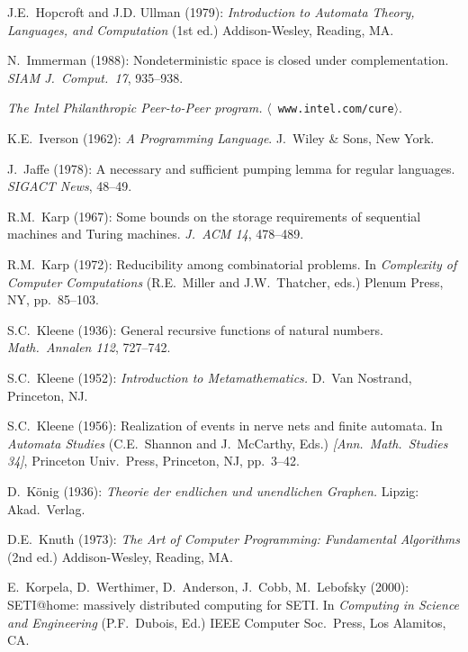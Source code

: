 \begin{thebibliography}{999}
J.E.~Hopcroft and J.D. Ullman (1979):
{\it Introduction to Automata Theory, Languages, and Computation} (1st
ed.)
Addison-Wesley, Reading, MA.


N.~Immerman (1988): Nondeterministic space is closed under
complementation.  {\it SIAM J.~Comput.~17}, 935--938.

{\it The Intel Philanthropic Peer-to-Peer program.}  $\langle${\tt
www.intel.com/cure}$\rangle$.

K.E.~Iverson (1962):
{\it A Programming Language}.
J.~Wiley \& Sons, New York.


J.~Jaffe (1978): A necessary and sufficient pumping lemma for regular
languages.  {\it SIGACT News}, 48--49.


R.M.~Karp (1967): Some bounds on the storage requirements of
sequential machines and Turing machines.  {\it J.~ACM 14}, 478--489.

R.M.~Karp (1972): Reducibility among combinatorial problems.  In {\it
Complexity of Computer Computations} (R.E.~Miller and J.W.~Thatcher,
eds.)  Plenum Press, NY, pp.~85--103.

S.C.~Kleene (1936): General recursive functions of natural numbers.
{\it Math.~Annalen 112}, 727--742.

S.C.~Kleene (1952):
{\it Introduction to Metamathematics.}
D.~Van Nostrand, Princeton, NJ.

S.C.~Kleene (1956): Realization of events in nerve nets and finite
automata.  In {\it Automata Studies} (C.E.~Shannon and J.~McCarthy,
Eds.) {\it [Ann.~Math.~Studies 34]}, Princeton Univ.~Press, Princeton,
NJ, pp.~3--42.

D.~K\"onig (1936):
{\it Theorie der endlichen und unendlichen Graphen.}  Lipzig: Akad.~Verlag.

D.E.~Knuth (1973): {\it The Art of Computer Programming: Fundamental
Algorithms} (2nd ed.)  Addison-Wesley, Reading, MA.

E.~Korpela, D.~Werthimer, D.~Anderson, J.~Cobb, M.~Lebofsky (2000):
SETI@home: massively distributed computing for SETI.  In {\it
Computing in Science and Engineering} (P.F.~Dubois, Ed.)  IEEE
Computer Soc.~Press, Los Alamitos, CA.


\end{thebibliography}
